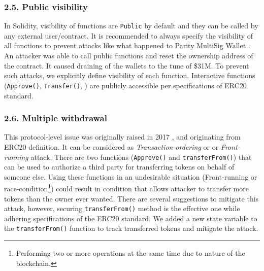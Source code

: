 \subsubsection*{2.5. Public visibility}
In Solidity, visibility of functions are \texttt{Public} by default and they can be called by any external user/contract. It is recommended to always specify the visibility of all functions to prevent attacks like what happened to Parity MultiSig Wallet \cite{ParityFirstHack}. An attacker was able to call public functions and reset the ownership address of the contract. It caused draining of the wallets to the tune of \$31M. To prevent such attacks, we explicitly define visibility of each function. Interactive functions (\eg \texttt{Approve()}, \texttt{Transfer()}, \etc) are publicly accessible per specifications of ERC20 standard.

\subsubsection*{2.6. Multiple withdrawal}
This protocol-level issue was originally raised in 2017 \cite{MikVlad}, \cite{TomHale} and originating from ERC20 definition. It can be considered as \textit{Transaction-ordering} or \cite{OrderingAttack} or \textit{Front-running} \cite{eskandari2019sok} attack. There are two functions (\ie \texttt{Approve()} and \texttt{transferFrom()}) that can be used to authorize a third party for transferring tokens on behalf of someone else. Using these functions  in an undesirable situation (\ie Front-running or race-condition\footnote{Performing two or more operations at the same time due to nature of the blockchain.}) could result in condition that allows attacker to transfer more tokens than the owner ever wanted. There are several suggestions to mitigate this attack, however, securing \texttt{transferFrom()} method is the effective one while adhering specifications of the ERC20 standard\cite{ERC20MWA}. We added a new state variable to the \texttt{transferFrom()} function to track transferred tokens and mitigate the attack. 

